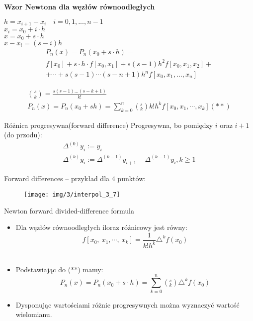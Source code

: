 \begin{frame}
\textbf{Wzor Newtona dla węzłów równoodległych}

$h=x_{i+1}-x_{i} \quad i=0, 1, ..., n-1$ \\
$x_i=x_0+i\cdot h$\\
$x=x_{0}+s\cdot h$ \\
$x-x_{i}=(s-i)h$ \\

\begin{gather*} P_{n}(x)=P_{n}(x_{0}+s\cdot h) =\\
   f[x_{0}]+s\cdot h\cdot f[x_{0}, x_{1}]+s(s - 1)h^{2}f[x_{0},x_{1},x_{2}]+ \\
+ \cdots +s(s-1)\cdots(s-n+1)h^{n}f[x_{0},x_{1},\dots ,x_{n}]
\end{gather*}

\begin{gather*}
\binom{s}{k}=\displaystyle \frac{s(s-1)\ldots(s-k+1)}{k!}\\
P_{n}(x)=P_{n}(x_{0}+sh)=\sum_{k=0}^{n}(_{k}^{s})k!h^{k}f[x_{0}, x_{1}, \cdots ,x_{k}](**)
\end{gather*}
\end{frame}
\begin{frame}{Różnica progresywna(forward difference)}
Progresywna, bo pomiędzy $i$ oraz $i+1$ (do przodu):
  \begin{gather*}
    \Delta^{(0)} y_i := y_i\\
    \Delta^{(k)} y_i := \Delta^{(k - 1)} y_{i+1} - \Delta^{(k - 1)} y_i, k \ge 1
  \end{gather*}

  Forward differences -- przykład dla 4 punktów:
  \begin{figure}[h]
  			\texttt{[image: img/3/interpol\_3\_7]}
  	\end{figure}
\end{frame}
\begin{frame}{Newton forward divided-difference formula }
\begin{itemize}
\item Dla węzłów równoodległych iloraz różnicowy jest równy:
$$f[x_{0},\displaystyle \ x_{1},\cdots,\ x_{k}]=\frac{1}{k!h^{k}}\triangle^{k}f(x_{0})$$ \\

\item Podstawiając do (**) mamy:
$$P_{n}(x)=P_n(x_0+s\cdot h)=\displaystyle
\sum_{k=0}^{n}(_{k}^{s})\triangle^{k}f(x_{0})$$
\item Dysponując wartościami różnic progresywnych można wyznaczyć wartość wielomianu.
\end{itemize}
\end{frame}



